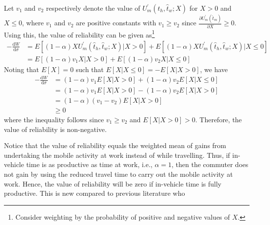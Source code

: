 \documentclass[12pt,a4paper,british]{article}
\makeatletter
\newenvironment{proof}[1][\proofname]{\par
    \normalfont\topsep6\p@\@plus6\p@\relax
    \trivlist
    \itemindent\parindent
    \item[\hskip\labelsep
          \scshape
      #1]\ignorespaces
  }{%
    \endtrivlist\@endpefalse
  }
\providecommand{\proofname}{Proof}
\makeatother
\begin{document}
\begin{proof}
Let $ v_1 $ and $v_2$ respectively denote the value of $U_{m}^{\prime}\left(\hat{t}_{h}, \hat{t}_{w}; X\right)$ for $ X > 0$ and $X \leq 0$, where $v_{1}$ and $v_{2}$ are positive constants with $v_{1}\geq v_{2}$ since $\frac{\partial U_{m}^{\prime} \left(\hat{t}_{m}\right)}{\partial X} \geq 0$. Using this, the value of reliability can be given as\footnote{Consider weighting by the probability of positive and negative values of $X$.}
\begin{align*}
-\frac{\mathrm{d}W}{\mathrm{d}\sigma} & = E\left[\left(1-\alpha\right) X U_{m}^{\prime} \left(\hat{t}_{h}, \hat{t}_{w}; X\right)\vert X>0\right]  + E\left[\left( 1 - \alpha \right) X U_{m}^{\prime}\left( \hat{t}_{h}, \hat{t}_{w}; X\right) \vert X\leq 0 \right] \\
 & = E\left[\left( 1 - \alpha \right) v_{1} X \vert X > 0 \right] + E\left[\left( 1 - \alpha \right) v_{2} X \vert X \leq 0 \right]
 \end{align*}%
Noting that $E\left[X\right]=0$ such that $E\left[X \vert X \leq 0 \right] = -E\left[ X \vert X > 0 \right]$, we have%
\begin{align*}
- \frac{\mathrm{d}W}{\mathrm{d}\sigma} & = \left(1-\alpha\right) v_{1} E\left[X\vert X > 0 \right] + \left(1-\alpha \right) v_{2} E\left[X \vert X\leq0\right]\\
 & =\left(1-\alpha\right)v_{1}E\left[X\vert X>0\right]-\left(1-\alpha\right)v_{2}E\left[X\vert X>0\right]\\
 & =\left(1-\alpha\right)\left(v_{1}-v_{2}\right)E\left[X\vert X>0\right]\\
 & \geq0
\end{align*}
where the inequality follows since $v_{1}\geq v_{2}$ and $E\left[X\vert X>0\right] > 0$. Therefore, the value of reliability is non-negative.
\end{proof}

Notice that the value of reliability equals the weighted mean of gains from undertaking the mobile activity at work instead of while travelling. Thus, if in-vehicle time is as productive as time at work, i.e., $\alpha=1$, then the commuter does not gain by using the reduced travel time to carry out the mobile activity at work. Hence, the value of reliability will be zero if in-vehicle time is fully productive. This is new compared to previous literature \citep{Small1982SchedulingConsumerActivities,FosgerauEngelson2011ValueTravelTime,FosgerauKarlstroem2010ValueReliability} who


\end{document}
